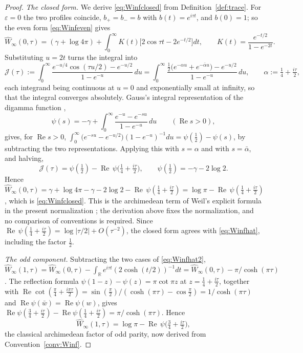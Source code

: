 \documentclass[11pt]{amsart}
\theoremstyle{definition}
\theoremstyle{remark}
\newcommand{\R}{\mathbb R}
\newcommand{\Rel}{\operatorname{Re}}
\newcommand{\Wh}{\widehat{W}}
\begin{document}
\begin{proof}
\emph{The closed form.}  We derive \eqref{eq:Winfclosed} from
Definition~\ref{def:trace}.  For $\varepsilon=0$ the two profiles coincide,
$b_{+}=b_{-}=b$ with $b(t)=e^{i\tau t}$, and $b(0)=1$; so the even form
\eqref{eq:Winfeven} gives
\[
\Wh_{\infty}(0,\tau)=(\gamma+\log4\pi)+\int_0^{\infty}K(t)
\bigl[2\cos\tau t-2e^{-t/2}\bigr]dt,\qquad
K(t)=\frac{e^{-t/2}}{1-e^{-2t}} .
\]
Substituting $u=2t$ turns the integral into
\[
\mathcal J(\tau):=\int_0^{\infty}
\frac{e^{-u/4}\cos(\tau u/2)-e^{-u/2}}{1-e^{-u}}\,du
=\int_0^{\infty}\frac{\tfrac12\bigl(e^{-\alpha u}+e^{-\bar\alpha u}\bigr)
-e^{-u/2}}{1-e^{-u}}\,du,\qquad \alpha:=\tfrac14+\tfrac{i\tau}{2},
\]
each integrand being continuous at $u=0$ and exponentially small at infinity,
so that the integral converges absolutely.  Gauss's integral representation
of the digamma function \cite[\S5.9]{DLMF},
\[
\psi(s)=-\gamma+\int_0^{\infty}\frac{e^{-u}-e^{-su}}{1-e^{-u}}\,du
\qquad(\Rel s>0),
\]
gives, for $\Rel s>0$,
$\int_0^{\infty}\bigl(e^{-su}-e^{-u/2}\bigr)(1-e^{-u})^{-1}du
=\psi(\tfrac12)-\psi(s)$, by subtracting the two representations.  Applying
this with $s=\alpha$ and with $s=\bar\alpha$, and halving,
\[
\mathcal J(\tau)=\psi(\tfrac12)-\Rel\,\psi\bigl(\tfrac14+\tfrac{i\tau}{2}\bigr),
\qquad \psi(\tfrac12)=-\gamma-2\log2 .
\]
Hence $\Wh_{\infty}(0,\tau)=\gamma+\log4\pi-\gamma-2\log2-
\Rel\,\psi(\tfrac14+\tfrac{i\tau}{2})=\log\pi-
\Rel\,\psi(\tfrac14+\tfrac{i\tau}{2})$, which is \eqref{eq:Winfclosed}.  This
is the archimedean term of Weil's explicit formula in the present
normalization \cite{Weil1952,CCWeilArch}; the derivation above fixes the
normalization, and no comparison of conventions is required.  Since
$\Rel\,\psi(\tfrac14+\tfrac{i\tau}{2})=\log|\tau/2|+O(\tau^{-2})$, the closed
form agrees with \eqref{eq:Winfhat}, including the factor $\tfrac12$.

\emph{The odd component.}  Subtracting the two cases of \eqref{eq:Winfhat2},
$\Wh_{\infty}(1,\tau)=\Wh_{\infty}(0,\tau)-\int_{\R}e^{i\tau t}(2\cosh(t/2))^{-1}dt
=\Wh_{\infty}(0,\tau)-\pi/\cosh(\pi\tau)$.  The reflection formula
$\psi(1-z)-\psi(z)=\pi\cot\pi z$ at $z=\tfrac14+\tfrac{i\tau}2$, together with
$\Rel\cot(\tfrac\pi4+\tfrac{i\pi\tau}2)=\sin(\tfrac\pi2)/(\cosh(\pi\tau)-\cos\tfrac\pi2)
=1/\cosh(\pi\tau)$ and $\Rel\psi(\bar w)=\Rel\psi(w)$, gives
$\Rel\psi(\tfrac34+\tfrac{i\tau}2)-\Rel\psi(\tfrac14+\tfrac{i\tau}2)=\pi/\cosh(\pi\tau)$.
Hence
\begin{equation}\label{eq:Winfodd}
\Wh_{\infty}(1,\tau)=\log\pi-\Rel\,\psi\bigl(\tfrac34+\tfrac{i\tau}{2}\bigr),
\end{equation}
the classical archimedean factor of odd parity, now derived from
Convention~\ref{conv:Winf}.


\end{proof}
\end{document}
